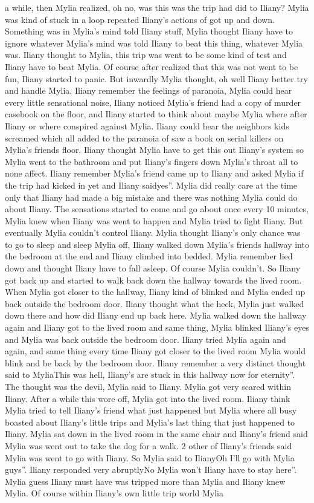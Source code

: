 \documentclass[12pt]{book}
\begin{document}
a while, then Mylia realized, oh no, was this was the trip had did to Iliany? Mylia was kind of stuck in a loop repeated Iliany's actions of got up and down. Something was in Mylia's mind told Iliany stuff, Mylia thought Iliany have to ignore whatever Mylia's mind was told Iliany to beat this thing, whatever Mylia was. Iliany thought to Mylia, this trip was went to be some kind of test and Iliany have to beat Mylia. Of course after realized that this was not went to be fun, Iliany started to panic. But inwardly Mylia thought, oh well Iliany better try and handle Mylia. Iliany remember the feelings of paranoia, Mylia could hear every little sensational noise, Iliany noticed Mylia's friend had a copy of murder casebook on the floor, and Iliany started to think about maybe Mylia where after Iliany or where conspired against Mylia. Iliany could hear the neighbors kids screamed which all added to the paranoia of saw a book on serial killers on Mylia's friends floor. Iliany thought Mylia have to get this out Iliany's system so Mylia went to the bathroom and put Iliany's fingers down Mylia's throat all to none affect. Iliany remember Mylia's friend came up to Iliany and asked Mylia if the trip had kicked in yet and Iliany saidyes''. Mylia did really care at the time only that Iliany had made a big mistake and there was nothing Mylia could do about Iliany. The sensations started to come and go about once every 10 minutes, Mylia knew when Iliany was went to happen and Mylia tried to fight Iliany. But eventually Mylia couldn't control Iliany. Mylia thought Iliany's only chance was to go to sleep and sleep Mylia off, Iliany walked down Mylia's friends hallway into the bedroom at the end and Iliany climbed into bedded. Mylia remember lied down and thought Iliany have to fall asleep. Of course Mylia couldn't. So Iliany got back up and started to walk back down the hallway towards the lived room. When Mylia got closer to the hallway, Iliany kind of blinked and Mylia ended up back outside the bedroom door. Iliany thought what the heck, Mylia just walked down there and how did Iliany end up back here. Mylia walked down the hallway again and Iliany got to the lived room and same thing, Mylia blinked Iliany's eyes and Mylia was back outside the bedroom door. Iliany tried Mylia again and again, and same thing every time Iliany got closer to the lived room Mylia would blink and be back by the bedroom door. Iliany remember a very distinct thought said to MyliaThis was hell, Iliany's are stuck in this hallway now for eternity''. The thought was the devil, Mylia said to Iliany. Mylia got very scared within Iliany. After a while this wore off, Mylia got into the lived room. Iliany think Mylia tried to tell Iliany's friend what just happened but Mylia where all busy boasted about Iliany's little trips and Mylia's last thing that just happened to Iliany. Mylia sat down in the lived room in the same chair and Iliany's friend said Mylia was went out to take the dog for a walk. 2 other of Iliany's friends said Mylia was went to go with Iliany. So Mylia said to IlianyOh I'll go with Mylia guys''. Iliany responded very abruptlyNo Mylia won't Iliany have to stay here''. Mylia guess Iliany must have was tripped more than Mylia and Iliany knew Mylia. Of course within Iliany's own little trip world Mylia 
\end{document}
